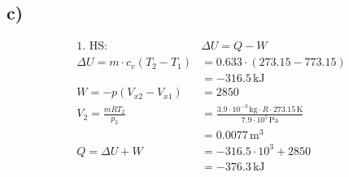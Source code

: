 

\subsection*{c)}

\begin{align*}
\text{1. HS:} \quad & \Delta U = Q - W \\
\Delta U = m \cdot c_v (T_2 - T_1) &= 0.633 \cdot (273.15 - 773.15) \\
&= -316.5 \, \text{kJ} \\
W = -p (V_{x2} - V_{x1}) &= 2850 \\
V_2 = \frac{m R T_2}{p_2} &= \frac{3.9 \cdot 10^{-3} \, \text{kg} \cdot R \cdot 273.15 \, \text{K}}{7.9 \cdot 10^5 \, \text{Pa}} \\
&= 0.0077 \, \text{m}^3 \\
Q = \Delta U + W &= -316.5 \cdot 10^3 + 2850 \\
&= -376.3 \, \text{kJ}
\end{align*}